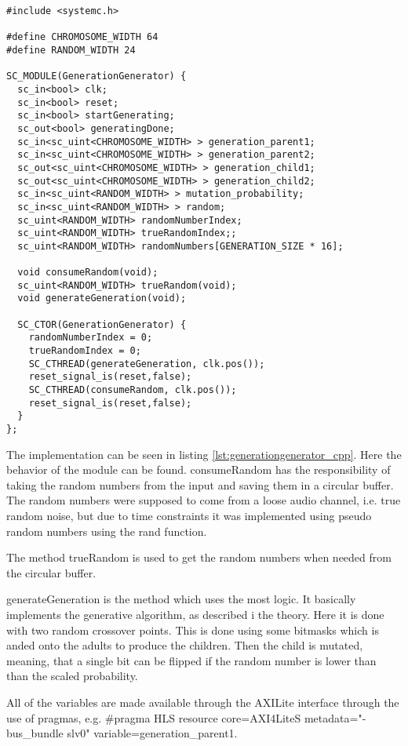 \begin{lstlisting}[style=customc++, caption={GenerationGenerator.h},label={lst:generationgenerator_h}]
#include <systemc.h>

#define CHROMOSOME_WIDTH 64
#define RANDOM_WIDTH 24

SC_MODULE(GenerationGenerator) {
  sc_in<bool> clk;
  sc_in<bool> reset;
  sc_in<bool> startGenerating;
  sc_out<bool> generatingDone;
  sc_in<sc_uint<CHROMOSOME_WIDTH> > generation_parent1;
  sc_in<sc_uint<CHROMOSOME_WIDTH> > generation_parent2;
  sc_out<sc_uint<CHROMOSOME_WIDTH> > generation_child1;
  sc_out<sc_uint<CHROMOSOME_WIDTH> > generation_child2;
  sc_in<sc_uint<RANDOM_WIDTH> > mutation_probability;
  sc_in<sc_uint<RANDOM_WIDTH> > random;
  sc_uint<RANDOM_WIDTH> randomNumberIndex;
  sc_uint<RANDOM_WIDTH> trueRandomIndex;;
  sc_uint<RANDOM_WIDTH> randomNumbers[GENERATION_SIZE * 16];

  void consumeRandom(void);
  sc_uint<RANDOM_WIDTH> trueRandom(void);
  void generateGeneration(void);
  
  SC_CTOR(GenerationGenerator) {
    randomNumberIndex = 0;
    trueRandomIndex = 0;
    SC_CTHREAD(generateGeneration, clk.pos());
    reset_signal_is(reset,false);
    SC_CTHREAD(consumeRandom, clk.pos());
    reset_signal_is(reset,false);
  }
};
\end{lstlisting}

The implementation can be seen in listing \ref{lst:generationgenerator_cpp}. Here the behavior of the module can be found. consumeRandom has the responsibility of taking the random numbers from the input and saving them in a circular buffer. The random numbers were supposed to come from a loose audio channel, i.e. true random noise, but due to time constraints it was implemented using pseudo random numbers using the rand function.

The method trueRandom is used to get the random numbers when needed from the circular buffer.

generateGeneration is the method which uses the most logic. It basically implements the generative algorithm, as described i the theory. Here it is done with two random crossover points. This is done using some bitmasks which is anded onto the adults to produce the children. Then the child is mutated, meaning, that a single bit can be flipped if the random number is lower than than the scaled probability.

All of the variables are made available through the AXILite interface through the use of pragmas, e.g. \#pragma HLS resource core=AXI4LiteS metadata="-bus\_bundle slv0" variable=generation\_parent1.

